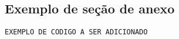 \documentclass[
	12pt,				%
	openright,			%
	oneside,			%
	a4paper,			%
	english,			%
	brazil				%
	]{abntex2}
\begin{document}
\begin{apendicesenv}

\partapendices

\chapter{\label{AnexoA}Exemplo de seção de anexo}

\begin{lstlisting}
EXEMPLO DE CODIGO A SER ADICIONADO
\end{lstlisting}

\end{apendicesenv}
\end{document}
